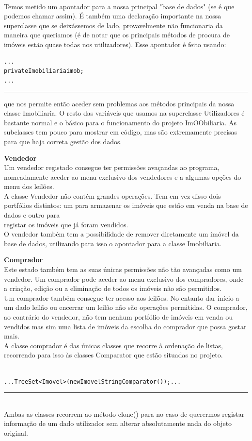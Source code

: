 \documentclass[12pt]{article}
\newenvironment{code}                    
{\textbf{
} \hspace{1cm} \hrulefill \\ 
\smallskip 
\begin{center}
\begin{minipage}{0.9\textwidth} 
\begin{alltt}\small}
{\end{alltt}
\end{minipage}
\end{center}
\hrule\smallskip
}
\begin{document}
~\\
Temos metido um apontador para a nossa principal "base de dados" (se é que podemos chamar assim). 
É também uma declaração importante na nossa superclasse que se deixássemos de lado, provavelmente não funcionaria da maneira que queriamos (é de notar que os principais métodos de procura de imóveis estão quase todas nos utilizadores).
\newline
Esse apontador é feito usando:
\newline
\begin{code}
...
    private Imobiliaria imob;
...
\end{code}
que nos permite então aceder sem problemas aos métodos principais da nossa classe Imobiliaria.
\newline
O resto das variáveis que usamos na superclasse Utilizadores é bastante normal e o básico para o funcionamento do projeto ImOObiliaria.
\newline
As subclasses tem pouco para mostrar em código, mas são extremamente precisas para que haja correta gestão dos dados.
\pagebreak

\textbf{Vendedor}
~\\
Um vendedor registado consegue ter permissões avaçandas ao programa, nomeadamente aceder ao menu exclusivo dos vendedores e a algumas opções do menu dos leilões. \\
A classe Vendedor não contém grandes operações. Tem em vez disso dois portfólios distintos: um para armazenar os imóveis que estão em venda na base de dados e outro para\\
registar os imóveis que já foram vendidos.
~\\
O vendedor também tem a possibilidade de remover diretamente um imóvel da base de dados, utilizando para isso o apontador para a classe Imobiliaria.


\textbf{Comprador}
~\\
Este estado também tem as suas únicas permissões não tão avançadas como um vendedor. Um comprador pode aceder ao menu exclusivo dos compradores, 
onde a criação, edição ou a eliminação de todos os imóveis não são permitidos.
\\
Um comprador também consegue ter acesso aos leilões. No entanto dar início a um dado leilão ou encerrar um leilão não são operações permitidas.
O comprador, ao contrário do vendedor, não tem nenhum portfólio de imóveis em venda ou vendidos mas sim uma lista de imóveis da escolha do comprador que possa gostar mais.
\\
A classe comprador é das únicas classes que recorre à ordenação de listas, recorrendo para isso às classes Comparator que estão situadas no projeto.
~\\
\newline
\begin{code}
... TreeSet <Imovel> (new ImovelStringComparator ()); ...
\end{code}
~\\
Ambas as classes recorrem ao método clone() para no caso de querermos registar informação de um dado utilizador sem alterar absolutamente nada do objeto original.
\end{document}
